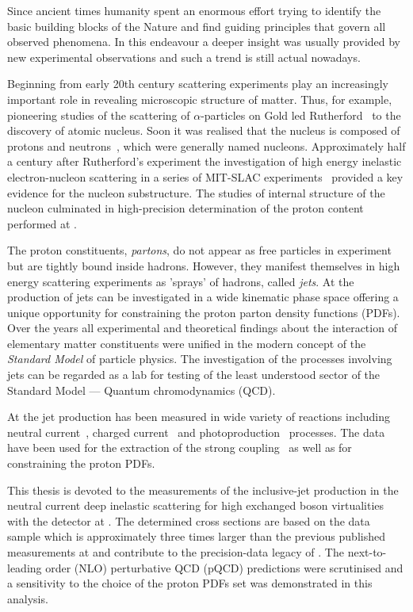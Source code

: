Since ancient times humanity spent an enormous effort trying to identify the basic building blocks of the Nature and find guiding principles that govern all observed phenomena. In this endeavour a deeper insight was usually provided by new experimental observations and such a trend is still actual nowadays.

Beginning from early 20th century scattering experiments play an increasingly important role in revealing microscopic structure of matter. Thus, for example, pioneering studies of the scattering of $\alpha$-particles on Gold led Rutherford~\cite{rutherford} to the discovery of atomic nucleus. Soon it was realised that the nucleus is composed of protons and neutrons~\cite{Chadwick}, which were generally named nucleons. Approximately half a century after Rutherford's experiment the investigation of high energy inelastic electron-nucleon scattering in a series of MIT-SLAC experiments~\cite{slac} provided a key evidence for the nucleon substructure. The studies of internal structure of the nucleon culminated in high-precision determination of the proton content performed at \hera.

The proton constituents, \emph{partons}, do not appear as free particles in experiment but are tightly bound inside hadrons. However, they manifest themselves in high energy scattering experiments as 'sprays' of hadrons, called \emph{jets}. At \hera the production of jets can be investigated in a wide kinematic phase space offering a unique opportunity for constraining the proton parton density functions (PDFs). Over the years all experimental and theoretical findings about the interaction of elementary matter constituents were unified in the modern concept of the \emph{Standard Model} of particle physics. The investigation of the processes involving jets can be regarded as a lab for testing of the least understood sector of the Standard Model --- Quantum chromodynamics (QCD).

At \hera the jet production has been measured in wide variety of reactions including neutral current~\cite{ncjets}, charged current~\cite{ccjets} and photoproduction~\cite{phpjets} processes. The data have been used for the extraction of the strong coupling~\cite{jets} as well as for constraining the proton PDFs.

This thesis is devoted to the measurements of the inclusive-jet production in the neutral current deep inelastic scattering for high exchanged boson virtualities with the \zeus detector at \hera. The determined cross sections are based on the data sample which is approximately three times larger than the previous published measurements at \zeus and contribute to the precision-data legacy of \hera. The next-to-leading order (NLO) perturbative QCD (pQCD) predictions were scrutinised and a sensitivity to the choice of the proton PDFs set was demonstrated in this analysis.

